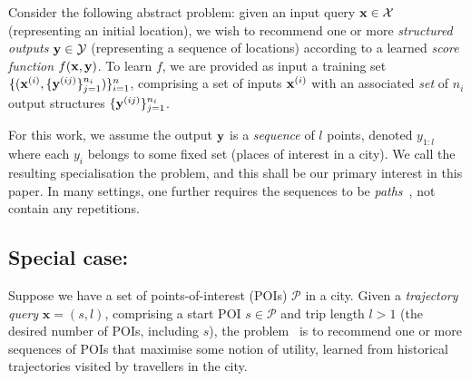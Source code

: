 Consider the following abstract problem:
given an input query $\mathbf{x} \in \mathcal{X}$ (representing an initial location),
we wish to recommend one or more \emph{structured outputs} $\mathbf{y} \in \mathcal{Y}$ (representing a sequence of locations)
according to a learned \emph{score function} $f(\mathbf{x},\mathbf{y})$.
To learn $f$,
we are provided as input a training set
$\{ ( \mathbf{x}^{({i})}, \{ \mathbf{y}^{({ij})} \}_{j=1}^{n_i} ) \}_{i=1}^{n}$,
comprising a set %
of inputs $\mathbf{x}^{({i})}$ with an associated \emph{set} of $n_i$ output structures $\{ \mathbf{y}^{({ij})} \}_{j=1}^{n_i}$.

For this work, we assume the output $\mathbf{y}$ is a \emph{sequence} of $l$ points, denoted $y_{1:l}$
where each $y_i$ belongs to some fixed set (\eg places of interest in a city).
We call the resulting specialisation the \emph{{\seqrec}} problem,
and this shall be our primary interest in this paper.
In many settings, one further requires the sequences to be \emph{paths}~\cite{west2001introduction}, \ie not contain any repetitions.





\subsection{Special case: {\trajrec}}

Suppose we have a set of points-of-interest (POIs) $\mathcal{P}$ in a city.
Given a \emph{trajectory query} $\mathbf{x} = (s, l)$,
comprising a start POI $s \in \mathcal{P}$ and trip length
$l \!>\! 1$ (\ie the desired number of POIs, including $s$),
the \emph{\trajrec} problem~\cite{bao2015recommendations,zheng2015trajectory} is to
recommend one or more sequences of POIs %
that maximise some notion of utility,
learned from %
historical
trajectories visited by travellers in the city.

